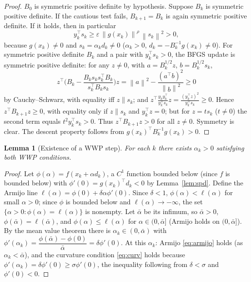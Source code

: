 \documentclass{amsart}
\newtheorem{lemma}{Lemma}
\theoremstyle{definition}
\newcommand{\norm}[1]{\left\lVert #1\right\rVert}
\begin{document}
\begin{proof}
$B_0$ is symmetric positive definite by hypothesis. Suppose $B_k$ is symmetric
positive definite. If the cautious test fails, $B_{k+1}=B_k$ is again symmetric
positive definite. If it holds, then in particular
\[
   y_k^\top s_k\ge\varepsilon\,\norm{g(x_k)}^{\rho}\,\norm{s_k}^2>0,
\]
because $g(x_k)\neq0$ and $s_k=\alpha_k d_k\neq0$ ($\alpha_k>0$,
$d_k=-B_k^{-1}g(x_k)\neq0$). For symmetric positive definite $B_k$ and a pair
with $y_k^\top s_k>0$, the BFGS update is symmetric positive definite: for any
$z\neq0$, with $a=B_k^{1/2}z$, $b=B_k^{1/2}s_k$,
\[
   z^\top\!\Big(B_k-\frac{B_k s_k s_k^\top B_k}{s_k^\top B_k s_k}\Big)z
   =\norm{a}^2-\frac{(a^\top b)^2}{\norm{b}^2}\ge0
\]
by Cauchy--Schwarz, with equality iff $z\parallel s_k$; and
$z^\top\frac{y_k y_k^\top}{y_k^\top s_k}z=\frac{(y_k^\top z)^2}{y_k^\top s_k}\ge0$.
Hence $z^\top B_{k+1}z\ge0$, with equality only if $z\parallel s_k$ and
$y_k^\top z=0$; but for $z=ts_k$ ($t\neq0$) the second term equals
$t^2y_k^\top s_k>0$. Thus $z^\top B_{k+1}z>0$ for all $z\neq0$. Symmetry is
clear. The descent property follows from $g(x_k)^\top B_k^{-1}g(x_k)>0$.
\end{proof}

\begin{lemma}[Existence of a WWP step]\label{lem:descent}
For each $k$ there exists $\alpha_k>0$ satisfying both WWP conditions.
\end{lemma}

\begin{proof}
Let $\phi(\alpha)=f(x_k+\alpha d_k)$, a $C^1$ function bounded below (since $f$
is bounded below) with $\phi'(0)=g(x_k)^\top d_k<0$ by Lemma~\ref{lem:spd}.
Define the Armijo line $\ell(\alpha)=\phi(0)+\delta\alpha\phi'(0)$. Since
$\delta<1$, $\phi(\alpha)<\ell(\alpha)$ for small $\alpha>0$; since $\phi$ is
bounded below and $\ell(\alpha)\to-\infty$, the set
$\{\alpha>0:\phi(\alpha)=\ell(\alpha)\}$ is nonempty. Let $\bar\alpha$ be its
infimum, so $\bar\alpha>0$, $\phi(\bar\alpha)=\ell(\bar\alpha)$, and
$\phi(\alpha)\le\ell(\alpha)$ for $\alpha\in(0,\bar\alpha]$ (Armijo holds on
$(0,\bar\alpha]$). By the mean value theorem there is
$\alpha_k\in(0,\bar\alpha)$ with
$\phi'(\alpha_k)=\dfrac{\phi(\bar\alpha)-\phi(0)}{\bar\alpha}=\delta\phi'(0)$.
At this $\alpha_k$: Armijo \eqref{eq:armijo} holds (as $\alpha_k<\bar\alpha$),
and the curvature condition \eqref{eq:curv} holds because
$\phi'(\alpha_k)=\delta\phi'(0)\ge\sigma\phi'(0)$, the inequality following from
$\delta<\sigma$ and $\phi'(0)<0$.
\end{proof}
\end{document}
